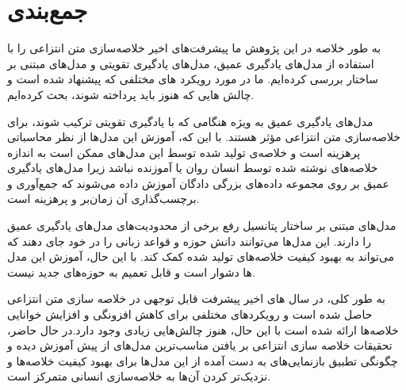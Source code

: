 \chapter{جمع‌بندی}
 به طور خلاصه در این پژوهش ما پیشرفت‌های اخیر خلاصه‌سازی متن انتزاعی را با استفاده از مدل‌های یادگیری عمیق، مدل‌های یادگیری تقویتی و مدل‌های مبتنی بر ساختار بررسی کرده‌ایم. ما در مورد رویکرد های مختلفی که پیشنهاد شده است و چالش هایی که هنوز باید پرداخته شوند، بحث کرده‌ایم.
 
مدل‌های یادگیری عمیق به ویژه هنگامی که با یادگیری تقویتی ترکیب شوند، برای خلاصه‌سازی متن انتزاعی  مؤثر هستند. با این که، آموزش این مدل‌ها  از نظر محاسباتی پرهزینه است و خلاصه‌ی تولید شده توسط این مدل‌های ممکن است  به اندازه خلاصه‌های نوشته شده توسط انسان روان یا آموزنده نباشد زیرا مدل‌های یادگیری عمیق بر روی مجموعه داده‌های بزرگی دادگان آموزش داده می‌شوند که جمع‌آوری و برچسب‌گذاری آن زمان‌بر و پرهزینه است.
 
 مدل‌های مبتنی بر ساختار پتانسیل رفع برخی از محدودیت‌های مدل‌های یادگیری عمیق را دارند. این مدل‌ها می‌توانند دانش حوزه و قواعد زبانی را در خود جای دهند که می‌تواند به بهبود کیفیت خلاصه‌های تولید شده کمک کند. با این حال، آموزش این مدل ها دشوار است و قابل تعمیم به حوزه‌های جدید نیست.
 
 به طور کلی، در سال های اخیر پیشرفت قابل توجهی در خلاصه سازی متن انتزاعی حاصل شده است و رویکردهای مختلفی برای کاهش افزونگی و افزایش خوانایی خلاصه‌ها ارائه شده است با این حال، هنوز چالش‌هایی زیادی وجود دارد.در حال حاضر، تحقیقات خلاصه سازی انتزاعی  بر یافتن مناسب‌ترین مدل‌های از پیش آموزش دیده و چگونگی تطبیق بازنمایی‌های به دست آمده از این مدل‌ها برای بهبود  کیفیت خلاصه‌ها و نزدیک‌تر کردن آن‌ها به  خلاصه‌سازی انسانی متمرکز است.
 
 

